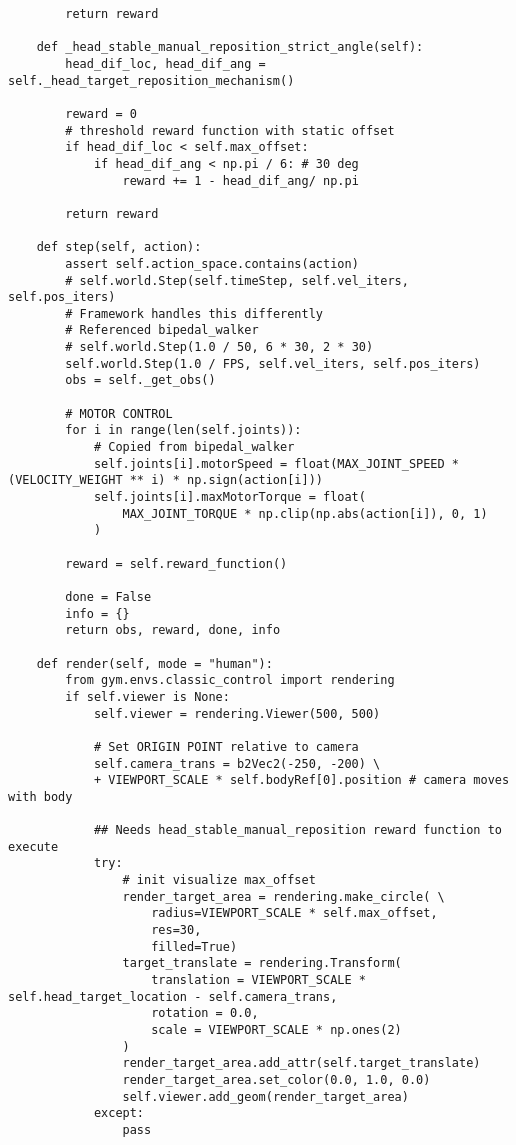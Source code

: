 \begin{lstlisting}
        return reward

    def _head_stable_manual_reposition_strict_angle(self):
        head_dif_loc, head_dif_ang = self._head_target_reposition_mechanism()

        reward = 0
        # threshold reward function with static offset
        if head_dif_loc < self.max_offset:
            if head_dif_ang < np.pi / 6: # 30 deg
                reward += 1 - head_dif_ang/ np.pi

        return reward

    def step(self, action):
        assert self.action_space.contains(action)
        # self.world.Step(self.timeStep, self.vel_iters, self.pos_iters)
        # Framework handles this differently
        # Referenced bipedal_walker
        # self.world.Step(1.0 / 50, 6 * 30, 2 * 30)
        self.world.Step(1.0 / FPS, self.vel_iters, self.pos_iters)
        obs = self._get_obs()

        # MOTOR CONTROL
        for i in range(len(self.joints)):
            # Copied from bipedal_walker
            self.joints[i].motorSpeed = float(MAX_JOINT_SPEED * (VELOCITY_WEIGHT ** i) * np.sign(action[i]))
            self.joints[i].maxMotorTorque = float(
                MAX_JOINT_TORQUE * np.clip(np.abs(action[i]), 0, 1)
            )

        reward = self.reward_function()

        done = False
        info = {}
        return obs, reward, done, info

    def render(self, mode = "human"):
        from gym.envs.classic_control import rendering
        if self.viewer is None:
            self.viewer = rendering.Viewer(500, 500)

            # Set ORIGIN POINT relative to camera
            self.camera_trans = b2Vec2(-250, -200) \
            + VIEWPORT_SCALE * self.bodyRef[0].position # camera moves with body

            ## Needs head_stable_manual_reposition reward function to execute
            try:
                # init visualize max_offset
                render_target_area = rendering.make_circle( \
                    radius=VIEWPORT_SCALE * self.max_offset,
                    res=30,
                    filled=True)
                target_translate = rendering.Transform(
                    translation = VIEWPORT_SCALE * self.head_target_location - self.camera_trans,
                    rotation = 0.0,
                    scale = VIEWPORT_SCALE * np.ones(2)
                )
                render_target_area.add_attr(self.target_translate)
                render_target_area.set_color(0.0, 1.0, 0.0)
                self.viewer.add_geom(render_target_area)
            except:
                pass


\end{lstlisting}
